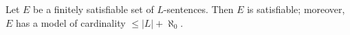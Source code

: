 Let $E$ be a finitely satisfiable set of $L$-sentences. Then $E$ is satisfiable; moreover, $E$ has a model of cardinality $\leq |L| + \aleph_0$.
